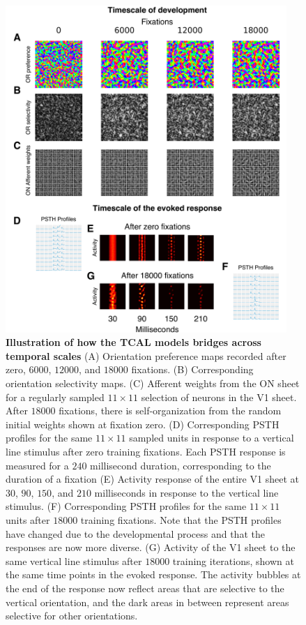 \documentclass[phd,ianc,twoside]{infthesis}
\begin{document}
\begin{figure}
\vspace*{-3ex}%
\center
\includegraphics[width=0.95\textwidth]{./figures/TCAL_Conclusion.pdf}
\caption{{\bf Illustration of how the TCAL models bridges across
    temporal scales} (A) Orientation preference maps recorded after
  zero, $6000$, $12000$, and $18000$ fixations. (B) Corresponding
  orientation selectivity maps. (C) Afferent weights from the ON sheet
  for a regularly sampled $11\times11$ selection of neurons in the V1
  sheet. After $18000$ fixations, there is self-organization from the
  random initial weights shown at fixation zero. (D) Corresponding PSTH
  profiles for the same $11\times11$ sampled units in response
  to a vertical line stimulus after zero training fixations. Each PSTH
  response is measured for a $240$ millisecond duration, corresponding
  to the duration of a fixation (E) Activity response of the entire V1
  sheet at $30$, $90$, $150$, and $210$ milliseconds in response to the
  vertical line stimulus. (F) Corresponding PSTH profiles for the same
  $11\times11$ units after $18000$ training fixations. Note that the
  PSTH profiles have changed due to the developmental process and that
  the responses are now more diverse. (G) Activity of the V1 sheet to
  the same vertical line stimulus after $18000$ training iterations,
  shown at the same time points in the evoked response. The activity
  bubbles at the end of the response now reflect areas that are
  selective to the vertical orientation, and the dark areas in between
  represent areas selective for other orientations.}
\label{fig:TCAL_Conclusion}
\end{figure}
\end{document}
